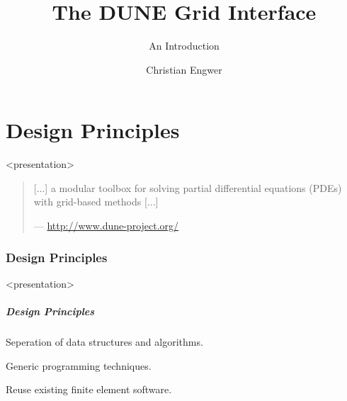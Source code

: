 \documentclass[aspectratio=169,11pt]{beamer}
\title{The DUNE Grid Interface}
\subtitle{An Introduction}
\author{Christian Engwer}
\institute[]
{
  Applied Mathematics\\WWU Münster\\
}
\theoremstyle{definition}
\begin{document}


\part{Design Principles}

\begin{onlyenv}<presentation>
\begin{frame}
   \partpage
   \pause
  \begin{quote}
    {\normalfont{}[...]} a modular toolbox for solving partial
    differential equations (PDEs) with grid-based
    methods {\normalfont{}[...]}

    \hfill--- {\normalfont \url{http://www.dune-project.org/}}
  \end{quote}
 \end{frame}
\end{onlyenv}

\section{Design Principles}

\begin{onlyenv}<presentation>
  \begin{frame} \frametitle{Design Principles}

    \begin{description}
    \item[Flexibility:]
      {Seperation of data structures and algorithms.}\\[2ex]
    \item[Efficiency:]
      {Generic programming techniques.}\\[2ex]
    \item[Legacy Code:]
      {Reuse existing finite element software.}\\[2ex]
    \end{description}

  \end{frame}
\end{onlyenv}
\end{document}
